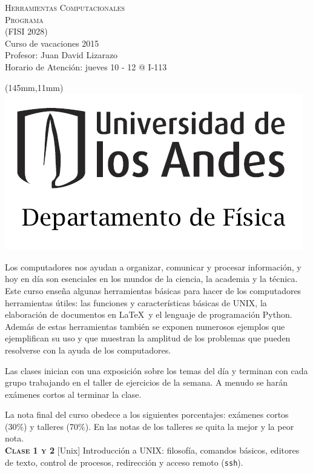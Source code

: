 \documentclass[letterpaper,10pt,onecolumn]{article}
\begin{document}
\begin{flushleft}

\textsc{\LARGE Herramientas Computacionales}\\[0.01cm]

\Large \textsc{Programa}\\[0.1cm]
\normalsize (FISI 2028) \\
Curso de vacaciones 2015 \\
Profesor: Juan David Lizarazo \\
Horario de Atención: jueves 10 - 12 @ I-113

\end{flushleft}

		\begin{textblock*}{20mm}(145mm,11mm)
  			\includegraphics[height=29 mm]{andes.png}
		\end{textblock*}

\vspace{0.2cm}
\addtocounter{mysection}{0}

\normalsize Los computadores nos ayudan a organizar, comunicar y procesar información, y hoy en día son esenciales en los mundos de la ciencia, la academia y la técnica. Este curso enseña algunas herramientas  básicas para hacer de los computadores herramientas útiles: las funciones y características básicas de UNIX, la elaboración de documentos en \LaTeX $\,$ y el lenguaje de programación Python. Además de estas herramientas también se exponen numerosos ejemplos que ejemplifican su uso y que muestran la amplitud de los problemas que pueden resolverse con la ayuda de los computadores. 

 Las clases inician con una exposición sobre los temas del día y terminan con cada grupo trabajando en el taller de ejercicios de la semana. A menudo se harán exámenes cortos al terminar la clase. 

 La nota final del curso obedece a los siguientes porcentajes: exámenes cortos (30\%) y talleres (70\%). En las notas de los talleres se quita la mejor y la peor nota.\\[0.1cm]


\noindent\normalsize \textbf{\textsc{Clase 1 y 2}} [Unix] Introducción a UNIX: filosofía, comandos básicos, editores de texto, control de procesos, redirección y acceso remoto (\verb+ssh+).\\[-0.3cm]
\end{document}
